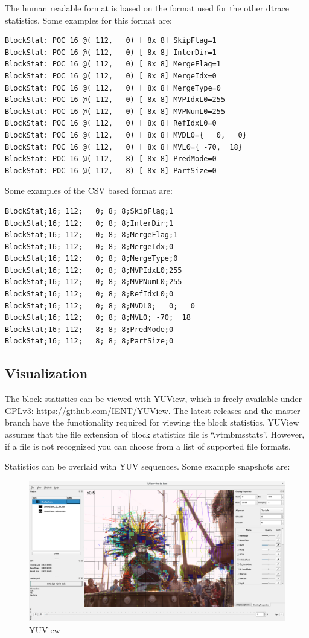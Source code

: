 ﻿\documentclass[a4paper,11pt]{jvetdoc}
\begin{document}
The human readable format is based on the format used for the other dtrace
statistics. Some examples for this format are:
\begin{verbatim}
BlockStat: POC 16 @( 112,   0) [ 8x 8] SkipFlag=1
BlockStat: POC 16 @( 112,   0) [ 8x 8] InterDir=1
BlockStat: POC 16 @( 112,   0) [ 8x 8] MergeFlag=1
BlockStat: POC 16 @( 112,   0) [ 8x 8] MergeIdx=0
BlockStat: POC 16 @( 112,   0) [ 8x 8] MergeType=0
BlockStat: POC 16 @( 112,   0) [ 8x 8] MVPIdxL0=255
BlockStat: POC 16 @( 112,   0) [ 8x 8] MVPNumL0=255
BlockStat: POC 16 @( 112,   0) [ 8x 8] RefIdxL0=0
BlockStat: POC 16 @( 112,   0) [ 8x 8] MVDL0={   0,   0}
BlockStat: POC 16 @( 112,   0) [ 8x 8] MVL0={ -70,  18}
BlockStat: POC 16 @( 112,   8) [ 8x 8] PredMode=0
BlockStat: POC 16 @( 112,   8) [ 8x 8] PartSize=0
\end{verbatim}

Some examples of the CSV based format are:
\begin{verbatim}
BlockStat;16; 112;   0; 8; 8;SkipFlag;1
BlockStat;16; 112;   0; 8; 8;InterDir;1
BlockStat;16; 112;   0; 8; 8;MergeFlag;1
BlockStat;16; 112;   0; 8; 8;MergeIdx;0
BlockStat;16; 112;   0; 8; 8;MergeType;0
BlockStat;16; 112;   0; 8; 8;MVPIdxL0;255
BlockStat;16; 112;   0; 8; 8;MVPNumL0;255
BlockStat;16; 112;   0; 8; 8;RefIdxL0;0
BlockStat;16; 112;   0; 8; 8;MVDL0;   0;   0
BlockStat;16; 112;   0; 8; 8;MVL0; -70;  18
BlockStat;16; 112;   8; 8; 8;PredMode;0
BlockStat;16; 112;   8; 8; 8;PartSize;0
\end{verbatim}

\subsection{Visualization}
\label{sec:visualization}

The block statistics can be viewed with YUView, which is freely available under
GPLv3: \url{https://github.com/IENT/YUView}. The latest releases and the master
branch have the functionality required for  viewing the block statistics. YUView
assumes that the file extension of block statistics file is
“.vtmbmsstats”. However, if a file is not recognized you can choose from a list
of supported file formats.


Statistics can be overlaid with YUV sequences. Some example snapshots are:

\begin{figure}[htpb]
  \centering
  \includegraphics[width=0.8\linewidth]{figures/YUView}
  \caption{YUView}
  \label{fig:yuview}
\end{figure}
\end{document}
